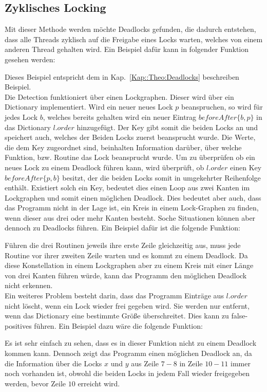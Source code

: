 \subsection{Zyklisches Locking}\label{Kap::Rev:Inconsistent}
Mit dieser Methode werden möchte Deadlocks gefunden, die dadurch entstehen,
dass alle Threads zyklisch auf die Freigabe eines Locks warten, welches von 
einem anderen Thread gehalten wird. Ein Beispiel dafür kann in folgender Funktion
gesehen werden:
\begin{figure}[H]
    
\end{figure}
Dieses Beispiel entspricht dem in Kap.~\ref*{Kap::Theo:Deadlocks} beschreiben 
Beispiel.\\
Die Detection funktioniert über einen Lockgraphen. Dieser wird über ein 
Dictionary implementiert. Wird ein neuer neues Lock $p$ beanspruchen, so wird für 
jedes Lock $b$, welches bereits gehalten wird ein  
neuer Eintrag $beforeAfter\{b, p\}$ in das Dictionary $l.order$ hinzugefügt. 
Der Key gibt somit die beiden Locks an und speichert auch, welches der Beiden Locks
zuerst beansprucht wurde. Die Werte, die dem Key zugeordnet sind, beinhalten 
Information darüber, über welche Funktion, bzw. Routine das Lock beansprucht wurde.
Um zu überprüfen ob ein neues Lock zu einem Deadlock führen kann, wird überprüft,
ob $l.order$ einen Key $beforeAfter\{p, b\}$ besitzt, der die beiden Locks somit in 
umgekehrter Reihenfolge enthält. Existiert solch ein Key, bedeutet dies einen 
Loop aus zwei Kanten im Lockgraphen und somit einen möglichen Deadlock. 
Dies bedeutet aber auch, dass das Programm nicht in der Lage ist, ein Kreis 
in einem Lock-Graphen zu finden, wenn dieser aus drei oder mehr Kanten besteht.
Soche Situationen können aber dennoch zu Deadlocks führen. Ein Beispiel dafür 
ist die folgende Funktion:
\begin{figure}[H]
    
\end{figure}
Führen die drei Routinen jeweils ihre erste Zeile gleichzeitig aus, muss jede 
Routine vor ihrer zweiten Zeile warten und es kommt zu einem Deadlock. Da diese
Konstellation in einem Lockgraphen aber zu einem Kreis mit einer Länge von drei 
Kanten führen würde, kann das Programm den möglichen Deadlock nicht erkennen.\\
Ein weiteres Problem besteht darin, dass das Programm Einträge aus $l.order$ nicht 
löscht, wenn ein Lock wieder frei gegeben wird. Sie werden nur entfernt, wenn 
das Dictionary eine bestimmte Größe überschreitet. Dies kann zu false-positives
führen. Ein Beispiel dazu wäre die folgende Funktion:  
\begin{figure}[H]
    
\end{figure}
Es ist sehr einfach zu sehen, dass es in dieser Funktion nicht zu einem Deadlock 
kommen kann. Dennoch zeigt das Programm einen möglichen Deadlock an, da die 
Information über die Locks $x$ und $y$ aus Zeile $7-8$ in Zeile $10-11$ immer 
noch vorhanden ist, obwohl die beiden Locks in jedem Fall wieder freigegeben
werden, bevor Zeile $10$ erreicht wird.



